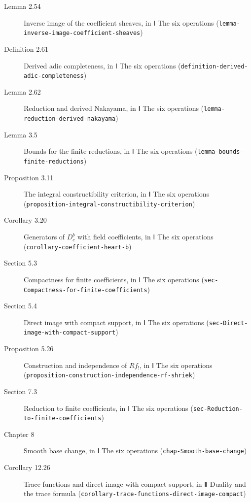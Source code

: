 \documentclass[11pt]{article}
\newcommand{\bpslug}[1]{\texttt{#1}}
\begin{document}
\begin{description}
\item[Lemma 2.54] Inverse image of the coefficient sheaves, in Ⅰ The six operations (\bpslug{lemma-{}\allowbreak{}inverse-{}\allowbreak{}image-{}\allowbreak{}coefficient-{}\allowbreak{}sheaves})
\item[Definition 2.61] Derived adic completeness, in Ⅰ The six operations (\bpslug{definition-{}\allowbreak{}derived-{}\allowbreak{}adic-{}\allowbreak{}completeness})
\item[Lemma 2.62] Reduction and derived Nakayama, in Ⅰ The six operations (\bpslug{lemma-{}\allowbreak{}reduction-{}\allowbreak{}derived-{}\allowbreak{}nakayama})
\item[Lemma 3.5] Bounds for the finite reductions, in Ⅰ The six operations (\bpslug{lemma-{}\allowbreak{}bounds-{}\allowbreak{}finite-{}\allowbreak{}reductions})
\item[Proposition 3.11] The integral constructibility criterion, in Ⅰ The six operations (\bpslug{proposition-{}\allowbreak{}integral-{}\allowbreak{}constructibility-{}\allowbreak{}criterion})
\item[Corollary 3.20] Generators of $D^b_c$ with field coefficients, in Ⅰ The six operations (\bpslug{corollary-{}\allowbreak{}coefficient-{}\allowbreak{}heart-{}\allowbreak{}b})
\item[Section 5.3] Compactness for finite coefficients, in Ⅰ The six operations (\bpslug{sec-{}\allowbreak{}Compactness-{}\allowbreak{}for-{}\allowbreak{}finite-{}\allowbreak{}coefficients})
\item[Section 5.4] Direct image with compact support, in Ⅰ The six operations (\bpslug{sec-{}\allowbreak{}Direct-{}\allowbreak{}image-{}\allowbreak{}with-{}\allowbreak{}compact-{}\allowbreak{}support})
\item[Proposition 5.26] Construction and independence of $Rf_!$, in Ⅰ The six operations (\bpslug{proposition-{}\allowbreak{}construction-{}\allowbreak{}independence-{}\allowbreak{}rf-{}\allowbreak{}shriek})
\item[Section 7.3] Reduction to finite coefficients, in Ⅰ The six operations (\bpslug{sec-{}\allowbreak{}Reduction-{}\allowbreak{}to-{}\allowbreak{}finite-{}\allowbreak{}coefficients})
\item[Chapter 8] Smooth base change, in Ⅰ The six operations (\bpslug{chap-{}\allowbreak{}Smooth-{}\allowbreak{}base-{}\allowbreak{}change})
\item[Corollary 12.26] Trace functions and direct image with compact support, in Ⅱ Duality and the trace formula (\bpslug{corollary-{}\allowbreak{}trace-{}\allowbreak{}functions-{}\allowbreak{}direct-{}\allowbreak{}image-{}\allowbreak{}compact})

\end{description}
\end{document}
